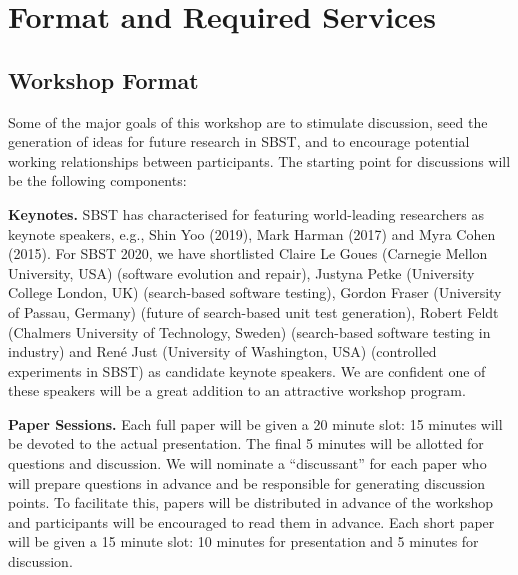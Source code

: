 \documentclass[sigconf,review]{acmart}
\newcommand{\TODO}[1]{\textbf{\textcolor{ScarletRed}{[TODO: #1]}}\xspace}
\newcommand{\TODO}[1]{}
\begin{document}
\section{Format and Required Services}

\subsection{Workshop Format}

Some of the major goals of this workshop are to stimulate discussion,
seed the generation of ideas for future research in SBST, and to
encourage potential working relationships between participants.  The
starting point for discussions will be the following components:

{\bf Keynotes.}  SBST has characterised for featuring world-leading
researchers as keynote speakers, e.g., Shin Yoo (2019), Mark Harman
(2017) and Myra Cohen (2015). For SBST 2020, we have shortlisted
Claire Le Goues (Carnegie Mellon University, USA) (software evolution
and repair), Justyna Petke (University College London, UK)
(search-based software
testing), %
Gordon Fraser (University of Passau, Germany) (future of search-based
unit test generation), Robert Feldt (Chalmers University of
Technology, Sweden) (search-based software testing in industry) and
Ren\'e Just (University of Washington, USA) (controlled experiments in
SBST) as candidate keynote speakers. We are confident one of these speakers will be a great addition to an attractive workshop program.

{\bf Paper Sessions.}  Each full paper will be given a 20
minute slot: 15 minutes will be devoted to the
actual presentation.  The final 5 minutes will be allotted for
questions and discussion.  We will nominate a ``discussant'' for each
paper who will prepare questions in advance and be responsible for
generating discussion points. To facilitate this, papers will be
distributed in advance of the workshop and participants will be
encouraged to read them in advance.  Each short paper will be given
a 15 minute slot: 10 minutes for presentation and 5 minutes for discussion.
\end{document}

